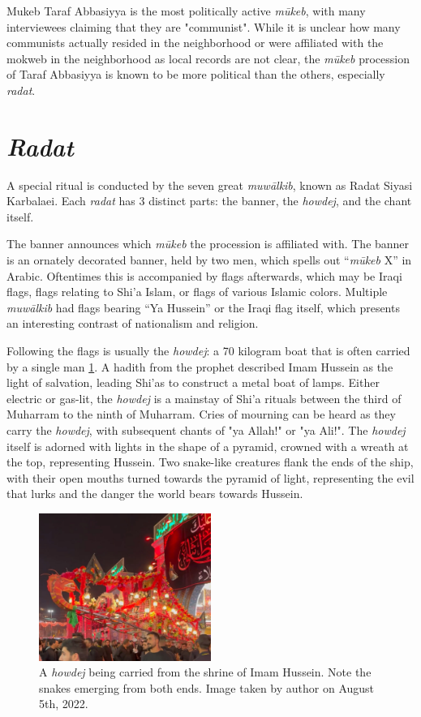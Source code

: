 Mukeb Taraf Abbasiyya is the most politically active \emph{mūkeb}, with many interviewees claiming that they are "communist". While it is unclear how many communists actually resided in the neighborhood or were affiliated with the mokweb in the neighborhood as local records are not clear, the \emph{mūkeb} procession of Taraf Abbasiyya is known to be more political than the others, especially \emph{radat}. 

\section{\emph{Radat}}
A special ritual is conducted by the seven great \emph{muwālkib}, known as Radat Siyasi Karbalaei. Each \emph{radat} has 3 distinct parts: the banner, the \emph{howdej}, and the chant itself. 

The banner announces which \emph{mūkeb} the procession is affiliated with. The banner is an ornately decorated banner, held by two men, which spells out “\emph{mūkeb} X” in Arabic. Oftentimes this is accompanied by flags afterwards, which may be Iraqi flags, flags relating to Shi'a Islam, or flags of various Islamic colors. Multiple \emph{muwālkib} had flags bearing “Ya Hussein” or the Iraqi flag itself, which presents an interesting contrast of nationalism and religion. 

Following the flags is usually the \emph{howdej}: a 70 kilogram boat that is often carried by a single man \ref{fig:howdej}. A hadith from the prophet described Imam Hussein as the light of salvation, leading Shi'as to construct a metal boat of lamps. Either electric or gas-lit, the \emph{howdej} is a mainstay of Shi'a rituals between the third of Muharram to the ninth of Muharram. Cries of mourning can be heard as they carry the \emph{howdej}, with subsequent chants of "ya Allah!" or "ya Ali!". The \emph{howdej} itself is adorned with lights in the shape of a pyramid, crowned with a wreath at the top, representing Hussein. Two snake-like creatures flank the ends of the ship, with their open mouths turned towards the pyramid of light, representing the evil that lurks and the danger the world bears towards Hussein. 

\begin{figure}
    \centering
    \includegraphics[width=0.5\textwidth]{images/howdej.jpg}
    \caption{A \emph{howdej} being carried from the shrine of Imam Hussein. Note the snakes emerging from both ends. Image taken by author on August 5th, 2022.}
    \label{fig:howdej}
\end{figure}

